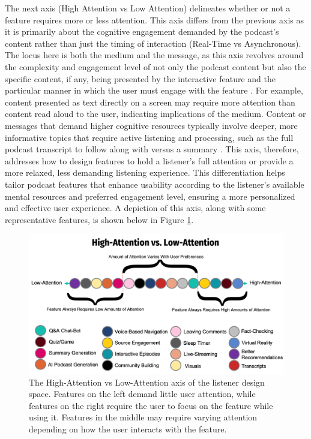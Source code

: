 \documentclass[12pt]{report}
\begin{document}
\begin{myfont}
        The next axis (High Attention vs Low Attention) delineates whether or not a feature requires more or less attention. This axis differs from the previous axis as it is primarily about the cognitive engagement demanded by the podcast's content rather than just the timing of interaction (Real-Time vs Asynchronous). The locus here is both the medium and the message, as this axis revolves around the complexity and engagement level of not only the podcast content but also the specific content, if any, being presented by the interactive feature and the particular manner in which the user must engage with the feature \citep{Sundar2010Designing}. For example, content presented as text directly on a screen may require more attention than content read aloud to the user, indicating implications of the medium. Content or messages that demand higher cognitive resources typically involve deeper, more informative topics that require active listening and processing, such as the full podcast transcript to follow along with versus a summary \citep{GarciaMarin2020}. This axis, therefore, addresses how to design features to hold a listener's full attention or provide a more relaxed, less demanding listening experience. This differentiation helps tailor podcast features that enhance usability according to the listener's available mental resources and preferred engagement level, ensuring a more personalized and effective user experience. A depiction of this axis, along with some representative features, is shown below in Figure \ref{fig:highattvslowatt}.

        \begin{figure}[H]
            \centering
              \includegraphics[width=1\textwidth]{figures/highattvslowatt.png}
              \caption{The High-Attention vs Low-Attention axis of the listener design space. Features on the left demand little user attention, while features on the right require the user to focus on the feature while using it. Features in the middle may require varying attention depending on how the user interacts with the feature.}
              \label{fig:highattvslowatt}
        \end{figure}
        

\end{myfont}
\end{document}
